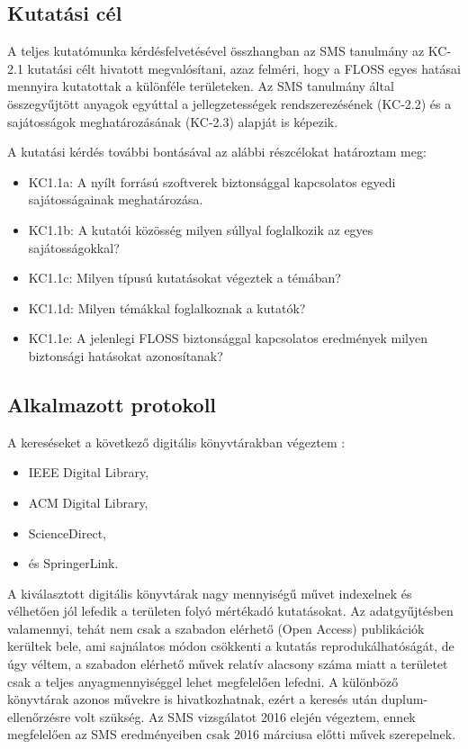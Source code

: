 \documentclass[12pt,magyar,a4paper,oneside]{scrreprt}
\providecommand{\tightlist}{%
  \setlength{\itemsep}{0pt}\setlength{\parskip}{0pt}}
\begin{document}
\hypertarget{kutatuxe1si-cuxe9l}{%
\subsection{Kutatási cél}\label{kutatuxe1si-cuxe9l}}

A teljes kutatómunka kérdésfelvetésével összhangban az SMS tanulmány az
KC-2.1 kutatási célt hivatott megvalósítani, azaz felméri, hogy a FLOSS
egyes hatásai mennyira kutatottak a különféle területeken. Az SMS
tanulmány által összegyűjtött anyagok egyúttal a jellegzetességek
rendszerezésének (KC-2.2) és a sajátosságok meghatározásának (KC-2.3)
alapját is képezik.

A kutatási kérdés további bontásával az alábbi részcélokat határoztam
meg:

\begin{itemize}
\tightlist
\item
  KC1.1a: A nyílt forrású szoftverek biztonsággal kapcsolatos egyedi
  sajátosságainak meghatározása.
\item
  KC1.1b: A kutatói közösség milyen súllyal foglalkozik az egyes
  sajátosságokkal?
\item
  KC1.1c: Milyen típusú kutatásokat végeztek a témában?
\item
  KC1.1d: Milyen témákkal foglalkoznak a kutatók?
\item
  KC1.1e: A jelenlegi FLOSS biztonsággal kapcsolatos eredmények milyen
  biztonsági hatásokat azonosítanak?
\end{itemize}

\hypertarget{alkalmazott-protokoll}{%
\subsection{Alkalmazott protokoll}\label{alkalmazott-protokoll}}

A kereséseket a következő digitális könyvtárakban végeztem :

\begin{itemize}
\tightlist
\item
  IEEE Digital Library,
\item
  ACM Digital Library,
\item
  ScienceDirect,
\item
  és SpringerLink.
\end{itemize}

A kiválasztott digitális könyvtárak nagy mennyiségű művet indexelnek és
vélhetően jól lefedik a területen folyó mértékadó kutatásokat. Az
adatgyűjtésben valamennyi, tehát nem csak a szabadon elérhető (Open
Access) publikációk kerültek bele, ami sajnálatos módon csökkenti a
kutatás reprodukálhatóságát, de úgy véltem, a szabadon elérhető művek
relatív alacsony száma miatt a területet csak a teljes anyagmennyiséggel
lehet megfelelően lefedni. A különböző könyvtárak azonos művekre is
hivatkozhatnak, ezért a keresés után duplum-ellenőrzésre volt szükség.
Az SMS vizsgálatot 2016 elején végeztem, ennek megfelelően az SMS
eredményeiben csak 2016 márciusa előtti művek szerepelnek.
\end{document}
